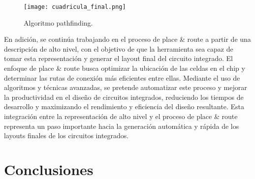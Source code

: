 \documentclass[reprint,amsmath,amssymb,aps]{revtex4-2}
\begin{document}
\begin{figure}[H]
	\centering
	\texttt{[image: cuadricula\_final.png]}
	\caption{Algoritmo pathfinding.}
	\label{cuadricula_final}
\end{figure}

En adición, se continúa trabajando en el proceso de place \& route a partir de una descripción de alto nivel, con el objetivo de que la herramienta sea capaz de tomar esta representación y generar el layout final del circuito integrado. El enfoque de place \& route busca optimizar la ubicación de las celdas en el chip y determinar las rutas de conexión más eficientes entre ellas. Mediante el uso de algoritmos y técnicas avanzadas, se pretende automatizar este proceso y mejorar la productividad en el diseño de circuitos integrados, reduciendo los tiempos de desarrollo y maximizando el rendimiento y eficiencia del diseño resultante. Esta integración entre la representación de alto nivel y el proceso de place \& route representa un paso importante hacia la generación automática y rápida de los layouts finales de los circuitos integrados.

\section{Conclusiones}

  

\nocite{*}
\end{document}
